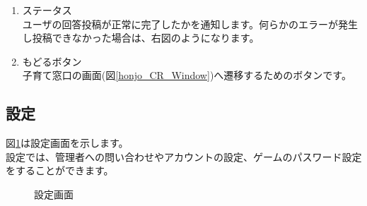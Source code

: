 \documentclass[a4j]{jarticle}
\begin{document}
\begin{enumerate}
  \renewcommand{\labelenumi}{\textcircled{\scriptsize \theenumi}}
  \item ステータス\\
        ユーザの回答投稿が正常に完了したかを通知します。何らかのエラーが発生し投稿できなかった場合は、右図のようになります。
  \item もどるボタン\\
        子育て窓口の画面(図\ref{honjo_CR_Window})へ遷移するためのボタンです。
\end{enumerate}

\newpage
\subsection{設定}
図\ref{configuration}は設定画面を示します。\\
設定では、管理者への問い合わせやアカウントの設定、ゲームのパスワード設定をすることができます。

\begin{figure}[H]
    \begin{center}
    \caption {設定画面}
    \label{configuration}
    \end{center}
\end{figure}
\end{document}
